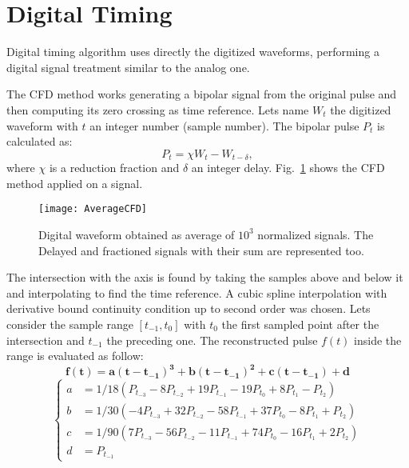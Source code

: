 \section*{Digital Timing}
Digital timing algorithm uses directly the digitized waveforms, performing a digital signal treatment similar to the analog one.
 
The CFD method works generating a bipolar signal from the original pulse and then computing its zero crossing as time reference. Lets name $W_t$ the digitized waveform with $t$ an integer number (sample number). The bipolar pulse $P_t$ is calculated as:
\begin{equation}
P_t=\chi W_t-W_{t-\delta},
\label{eq:bipolarCFD}
\end{equation}
where $\chi$ is a reduction fraction and $\delta$ an integer delay.  Fig.~\ref{Fig:DigitalCFD} shows the CFD method applied on a signal. 
\begin{figure}[h!]
	\centering
	\texttt{[image: AverageCFD]}
	\caption{Digital waveform obtained as average of $10^3$ normalized signals. The Delayed and fractioned signals with their sum are represented too. }
	\label{Fig:DigitalCFD}
\end{figure}

The intersection with the axis is found by taking the samples above and below  it  and interpolating to find the time reference. 
A cubic spline interpolation with derivative bound continuity condition up to second order was chosen.
Lets consider the sample range $[t_{-1},t_{0}]$ with $t_{0}$ the first sampled point after the intersection and $t_{-1}$ the preceding one. The reconstructed pulse $f(t)$ inside the range is evaluated as follow:\\
\[\mathbf{f(t)=a (t-t_{-1})^3+b (t-t_{-1})^2+c (t-t_{-1})+d}\]
\[
\left\{
\begin{aligned}
a &=1/18 (P_{t_{-3}}-8 P_{t_{-2}}+19 P_{t_{-1}}-19 P_{t_{0}}+8 P_{t_{1}}-P_{t_{2}})\\
b &=1/30 (-4 P_{t_{-3}}+32 P_{t_{-2}}-58 P_{t_{-1}}+37 P_{t_{0}}-8 P_{t_{1}}+ P_{t_{2}})\\
c &=1/90 (7 P_{t_{-3}}-56 P_{t_{-2}}-11 P_{t_{-1}}+74 P_{t_{0}}-16 P_{t_{1}}+2 P_{t_{2}})\\
d &=P_{t_{-1}}
\end{aligned}
\right.
\]


